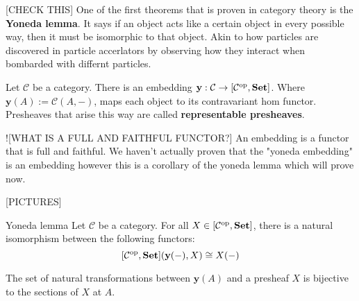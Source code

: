 
[CHECK THIS] One of the first theorems that is proven in category theory is the \textbf{Yoneda lemma}. It says if an object acts like a certain object in every possible way, then it must be isomorphic to that object. Akin to how particles are discovered in particle accerlators by observing how they interact when bombarded with differnt particles.

\begin{lemma}
    Let $\mathcal{C}$ be a category. There is an embedding $\mathbf{y} : \mathcal{C} \to [\mathcal{C}^{\text{op}}, {\normalfont\textbf{Set}}]$. 
    Where $\mathbf{y}(A) := \mathcal{C}( A, - )$, maps each object to its contravariant hom functor. 
    Presheaves that arise this way are called \textbf{representable presheaves}.
\end{lemma}

\begin{remark}
    ![WHAT IS A FULL AND FAITHFUL FUNCTOR?]
    An embedding is a functor that is full and faithful. We haven't actually proven that the "yoneda embedding" is an embedding however this is a corollary of the yoneda lemma which will prove now.
\end{remark}

[PICTURES]

\begin{theorem}{Yoneda lemma}
    Let $\mathcal{C}$ be a category. For all $X \in [\mathcal{C}^{\text{op}}, {\normalfont\textbf{Set}}]$, there is a natural isomorphism between the following functors:
        $$[\mathcal{C}^{\text{op}}, {\normalfont\textbf{Set}}](\mathbf{y}(-), X) \cong X(-)$$
\end{theorem}

\begin{remark}
    The set of natural transformations between $\mathbf{y}(A)$ and a presheaf $X$ is bijective to the sections of $X$ at $A$.
\end{remark}





